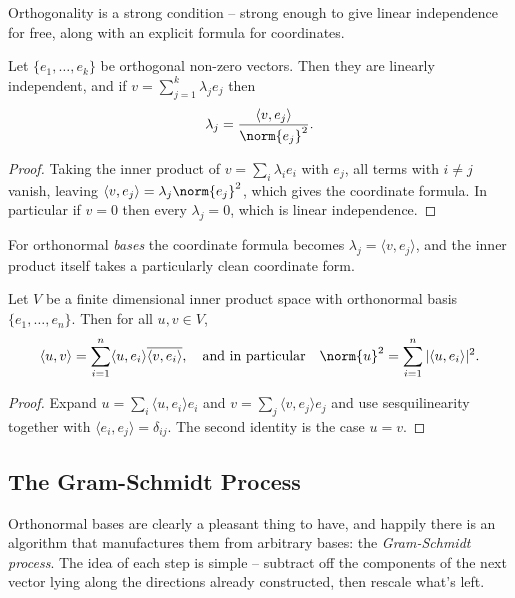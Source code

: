 \documentclass[a4paper]{scrartcl}
\begin{document}
Orthogonality is a strong condition -- strong enough to give linear independence for free, along with an explicit formula for coordinates.

\begin{lemma}
    Let $\{e_1, \dots, e_k\}$ be orthogonal non-zero vectors. Then they are linearly independent, and if $v = \sum_{j = 1}^k \lambda_j e_j$ then
    $$
    \lambda_j = \frac{\langle v, e_j \rangle}{\norm{e_j}^2}.
    $$
\end{lemma}
\begin{proof}
    Taking the inner product of $v = \sum_i \lambda_i e_i$ with $e_j$, all terms with $i \neq j$ vanish, leaving $\langle v, e_j \rangle = \lambda_j \norm{e_j}^2$, which gives the coordinate formula. In particular if $v = 0$ then every $\lambda_j = 0$, which is linear independence.
\end{proof}

For orthonormal \emph{bases} the coordinate formula becomes $\lambda_j = \langle v, e_j\rangle$, and the inner product itself takes a particularly clean coordinate form.

\begin{corollary}
    Let $V$ be a finite dimensional inner product space with orthonormal basis $\{e_1, \dots, e_n\}$. Then for all $u, v \in V$,
    $$
    \langle u, v \rangle = \sum_{i = 1}^n \langle u, e_i \rangle \overline{\langle v, e_i\rangle}, \quad \text{and in particular} \quad \norm{u}^2 = \sum_{i = 1}^n |\langle u, e_i \rangle|^2.
    $$
\end{corollary}
\begin{proof}
    Expand $u = \sum_i \langle u, e_i\rangle e_i$ and $v = \sum_j \langle v, e_j \rangle e_j$ and use sesquilinearity together with $\langle e_i, e_j \rangle = \delta_{ij}$. The second identity is the case $u = v$.
\end{proof}

\subsection{The Gram-Schmidt Process}

Orthonormal bases are clearly a pleasant thing to have, and happily there is an algorithm that manufactures them from arbitrary bases: the \emph{Gram-Schmidt process}. The idea of each step is simple -- subtract off the components of the next vector lying along the directions already constructed, then rescale what's left.
\end{document}
